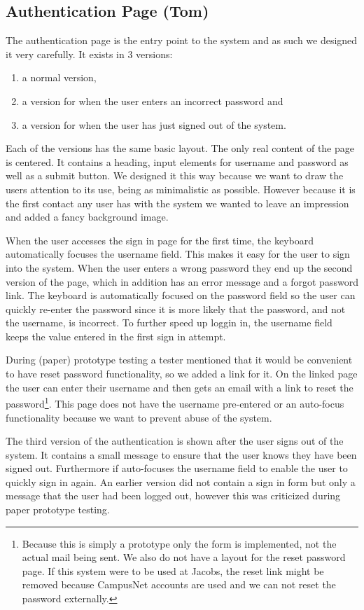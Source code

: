 \subsection{Authentication Page (Tom)}

The authentication page is the entry point to the system and as such we designed it very carefully. It exists in 3 versions:

\begin{enumerate}
  \item a normal version,
  \item a version for when the user enters an incorrect password and
  \item a version for when the user has just signed out of the system.
\end{enumerate}

Each of the versions has the same basic layout. The only real content of the page is centered. It contains a heading, input elements for username and password as well as a submit button. We designed it this way because we want to draw the users attention to its use, being as minimalistic as possible. However because it is the first contact any user has with the system we wanted to leave an impression and added a fancy background image.

When the user accesses the sign in page for the first time, the keyboard automatically focuses the username field. This makes it easy for the user to sign into the system. When the user enters a wrong password they end up the second version of the page, which in addition has an error message and a forgot password link. The keyboard is automatically focused on the password field so the user can quickly re-enter the password since it is more likely that the password, and not the username, is incorrect. To further speed up loggin in, the username field keeps the value entered in the first sign in attempt.

During (paper) prototype testing a tester mentioned that it would be convenient to have reset password functionality, so we added a link for it.  On the linked page the user can enter their username and then gets an email with a link to reset the password\footnote{Because this is simply a prototype only the form is implemented, not the actual mail being sent. We also do not have a layout for the reset password page. If this system were to be used at Jacobs, the reset link might be removed because CampusNet accounts are used and we can not reset the password externally. }. This page does not have the username pre-entered or an auto-focus functionality because we want to prevent abuse of the system.

The third version of the authentication is shown after the user signs out of the system. It contains a small message to ensure that the user knows they have been signed out. Furthermore if auto-focuses the username field to enable the user to quickly sign in again. An earlier version did not contain a sign in form but only a message that the user had been logged out, however this was criticized during paper prototype testing. 

